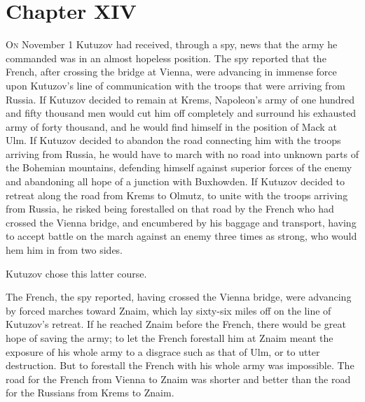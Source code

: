 
\chapter*{Chapter XIV}
\ifaudio     {} \fi

\lettrine[lines=2, loversize=0.3, lraise=0]{\initfamily O}{n}
November 1 Kutuzov had received, through a spy, news that the
army he commanded was in an almost hopeless position. The spy
reported that the French, after crossing the bridge at Vienna,
were advancing in immense force upon Kutuzov's line of
communication with the troops that were arriving from Russia. If
Kutuzov decided to remain at Krems, Napoleon's army of one
hundred and fifty thousand men would cut him off completely and
surround his exhausted army of forty thousand, and he would find
himself in the position of Mack at Ulm. If Kutuzov decided to
abandon the road connecting him with the troops arriving from
Russia, he would have to march with no road into unknown parts of
the Bohemian mountains, defending himself against superior forces
of the enemy and abandoning all hope of a junction with
Buxhowden. If Kutuzov decided to retreat along the road from
Krems to Olmutz, to unite with the troops arriving from Russia,
he risked being forestalled on that road by the French who had
crossed the Vienna bridge, and encumbered by his baggage and
transport, having to accept battle on the march against an enemy
three times as strong, who would hem him in from two sides.

Kutuzov chose this latter course.

The French, the spy reported, having crossed the Vienna bridge,
were advancing by forced marches toward Znaim, which lay
sixty-six miles off on the line of Kutuzov's retreat. If he
reached Znaim before the French, there would be great hope of
saving the army; to let the French forestall him at Znaim meant
the exposure of his whole army to a disgrace such as that of Ulm,
or to utter destruction. But to forestall the French with his
whole army was impossible. The road for the French from Vienna to
Znaim was shorter and better than the road for the Russians from
Krems to Znaim.

